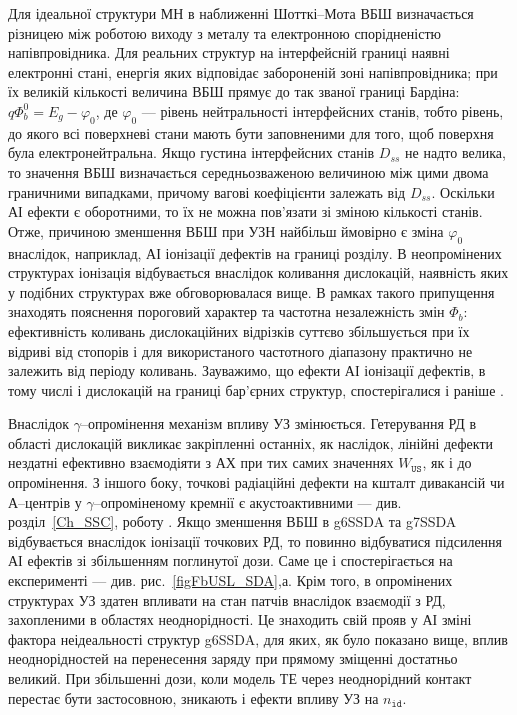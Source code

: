 Для ідеальної структури МН в наближенні Шотткі--Мота ВБШ визначається різницею між роботою виходу з металу та електронною спорідненістю напівпровідника.
Для реальних структур на інтерфейсній границі наявні електронні стані, енергія яких відповідає забороненій зоні напівпровідника;
при їх великій кількості величина ВБШ прямує до так званої границі Бардіна: $q\Phi_b^0=E_g-\varphi_0$,
де $\varphi_0$ --- рівень нейтральності інтерфейсних станів, тобто рівень, до якого всі поверхневі стани мають бути заповненими для того, щоб
поверхня була електронейтральна.
Якщо густина інтерфейсних станів $D_{ss}$ не надто велика, то значення ВБШ визначається середньозваженою величиною між цими двома
граничними випадками, причому вагові коефіцієнти залежать від $D_{ss}$.
Оскільки АІ ефекти є оборотними, то їх не можна пов'язати зі зміною кількості станів.
Отже, причиною зменшення ВБШ при УЗН найбільш ймовірно є зміна $\varphi_0$ внаслідок, наприклад, АІ іонізації дефектів на границі розділу.
В неопромінених структурах іонізація відбувається внаслідок коливання дислокацій, наявність яких у подібних структурах вже обговорювалася вище.
В рамках такого припущення знаходять пояснення пороговий характер та частотна незалежність змін $\Phi_b$:
ефективність коливань дислокаційних відрізків суттєво збільшується при їх відриві від стопорів і для використаного частотного діапазону
практично не залежить від періоду коливань.
Зауважимо, що ефекти АІ іонізації дефектів, в тому числі і дислокацій на границі бар'єрних структур, спостерігалися і раніше \cite{Olikh:FTP2011,Korotchenkov1995,OstrKorBook}.


Внаслідок $\gamma$--опромінення механізм впливу УЗ змінюється.
Гетерування РД в області дислокацій викликає закріпленні останніх, як наслідок, лінійні дефекти нездатні ефективно взаємодіяти з АХ при тих самих значеннях
$W_\mathtt{US}$, як і до опромінення.
З іншого боку, точкові радіаційні дефекти на кшталт дивакансій чи А--центрів у $\gamma$--опроміненому кремнії є акустоактивними --- див. розділ~\ref{Ch_SSC}, роботу \cite{YOlikh2006TPLr}.
Якщо зменшення ВБШ в g6SSDA та g7SSDA відбувається внаслідок іонізації точкових РД, то повинно відбуватися підсилення АІ ефектів зі збільшенням поглинутої дози.
Саме це і спостерігається на експерименті --- див. рис.~\ref{figFbUSL_SDA},а.
Крім того, в опромінених структурах УЗ здатен впливати на стан патчів внаслідок взаємодії з РД, захопленими в областях неоднорідності.
Це знаходить свій прояв у АІ зміні фактора неідеальності структур g6SSDA, для яких, як було показано вище, вплив неоднорідностей на перенесення заряду при прямому зміщенні достатньо великий.
При збільшенні дози, коли модель ТЕ через неоднорідний контакт перестає бути застосовною, зникають і ефекти впливу УЗ на $n_\mathtt{id}$.


